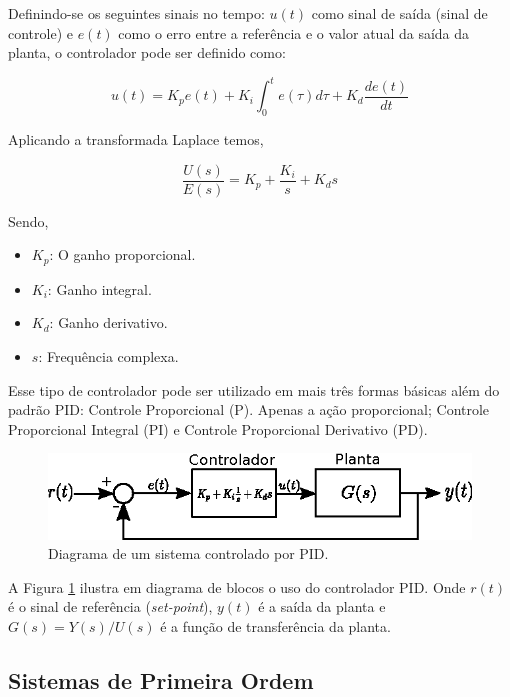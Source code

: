 Definindo-se os seguintes sinais no tempo: $u(t)$ como sinal de saída (sinal de controle) e $e(t)$ como o erro entre a referência e o valor atual da saída da planta, o controlador pode ser definido como:

\begin{equation}
    u(t) = K_{p}e(t) + K_{i} \int^{t}_{0}e(\tau)d\tau + K_{d}\frac{d e(t)}{dt}
\end{equation}

Aplicando a transformada Laplace temos,

\begin{equation}
    \frac{U(s)}{E(s)} = K_{p} + \frac{K_{i}}{s} + K_{d}s
\end{equation}

Sendo,

\begin{itemize}
    \item $K_p$: O ganho proporcional.
    \item $K_i$: Ganho integral.
    \item $K_d$: Ganho derivativo.
    \item $s$: Frequência complexa.
\end{itemize}

Esse tipo de controlador pode ser utilizado em mais três formas básicas além do padrão PID: Controle Proporcional (P). Apenas a ação proporcional; Controle Proporcional Integral (PI) e Controle Proporcional Derivativo (PD).

\begin{figure}[H]
    \centering
    \includegraphics[width=\textwidth]{figuras/ilustracoes/diagrama_controlador_PID.eps}
    \caption{Diagrama de um sistema controlado por PID.}
    \label{fig:diagrama_controlador_PID}
\end{figure}

A Figura \ref{fig:diagrama_controlador_PID} ilustra em diagrama de blocos o uso do controlador PID. Onde $r(t)$ é o sinal de referência (\emph{set-point}), $y(t)$ é a saída da planta e $G(s) = Y(s)/U(s)$ é a função de transferência da planta.

\subsection{Sistemas de Primeira Ordem}
\label{sec:sistema_de_primeira_ordem}

